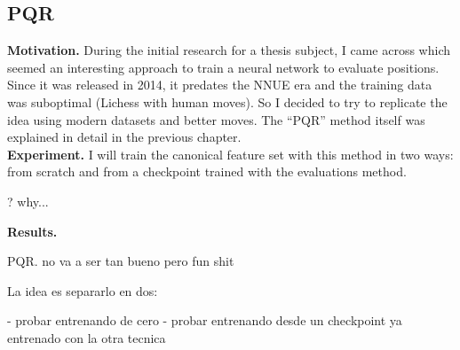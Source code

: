 \subsection{PQR}

\textbf{Motivation.} During the initial research for a thesis subject, I came across \cite{dlchess:2014} which seemed an interesting approach to train a neural network to evaluate positions. Since it was released in 2014, it predates the NNUE era and the training data was suboptimal (Lichess with human moves). So I decided to try to replicate the idea using modern datasets and better moves. The \enquote{PQR} method itself was explained in detail in the previous chapter. \\

\textbf{Experiment.} I will train the canonical  feature set with this method in two ways: from scratch and from a checkpoint trained with the evaluations method.

? why...


\textbf{Results.}

PQR. no va a ser tan bueno pero fun shit

La idea es separarlo en dos:

- probar entrenando de cero
- probar entrenando desde un checkpoint ya entrenado con la otra tecnica

